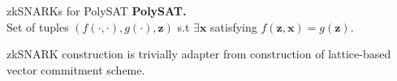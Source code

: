 \begin{frame}{zkSNARKs for PolySAT}
	\textbf{PolySAT.} \\Set of tuples $(f(\cdot, \cdot), g(\cdot), \mathbf{z})$ s.t $\exists \mathbf{x}$ satisfying $f(\mathbf{z}, \mathbf{x}) = g(\mathbf{z})$.\pause
	
	zkSNARK construction is trivially adapter from construction of lattice-based vector commitment scheme.
\end{frame}